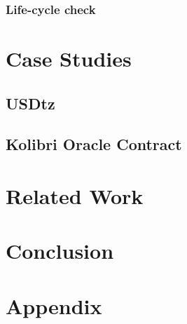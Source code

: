 \documentclass[a4paper,UKenglish,cleveref, autoref, thm-restate]{lipics-v2021}
\begin{document}
\subsubsection{Life-cycle check}
\section {Case Studies}
\subsection{USDtz}

\subsection{Kolibri Oracle Contract}
\section {Related Work}
\section {Conclusion}
\section {Appendix}
\end{document}
